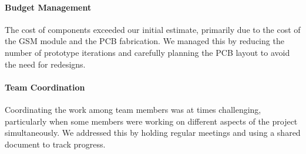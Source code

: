 \documentclass{article}
\begin{document}
\paragraph{Budget Management}

The cost of components exceeded our initial estimate, primarily due to the cost of the GSM module and the PCB fabrication. We managed this by reducing the number of prototype iterations and carefully planning the PCB layout to avoid the need for redesigns.

\paragraph{Team Coordination}

Coordinating the work among team members was at times challenging, particularly when some members were working on different aspects of the project simultaneously. We addressed this by holding regular meetings and using a shared document to track progress.
\end{document}
